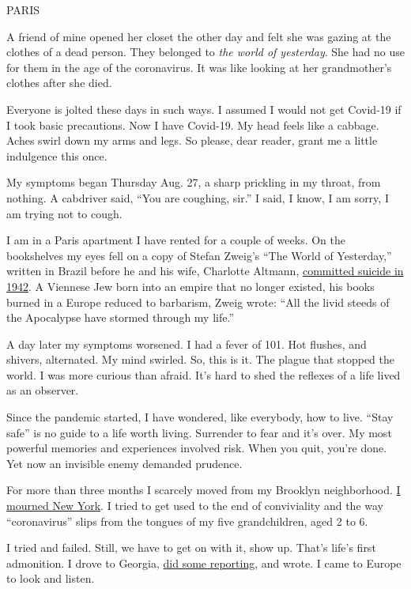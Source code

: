 PARIS

A friend of mine opened her closet the other day and felt she was gazing
at the clothes of a dead person. They belonged to \emph{the world of
yesterday}. She had no use for them in the age of the coronavirus. It
was like looking at her grandmother's clothes after she died.

Everyone is jolted these days in such ways. I assumed I would not get
Covid-19 if I took basic precautions. Now I have Covid-19. My head feels
like a cabbage. Aches swirl down my arms and legs. So please, dear
reader, grant me a little indulgence this once.

My symptoms began Thursday Aug. 27, a sharp prickling in my throat, from
nothing. A cabdriver said, ``You are coughing, sir.'' I said, I know, I
am sorry, I am trying not to cough.

I am in a Paris apartment I have rented for a couple of weeks. On the
bookshelves my eyes fell on a copy of Stefan Zweig's ``The World of
Yesterday,'' written in Brazil before he and his wife, Charlotte
Altmann,
\href{https://www.newyorker.com/magazine/2012/08/27/the-escape-artist-3}{committed
suicide in 1942}. A Viennese Jew born into an empire that no longer
existed, his books burned in a Europe reduced to barbarism, Zweig wrote:
``All the livid steeds of the Apocalypse have stormed through my life.''

A day later my symptoms worsened. I had a fever of 101. Hot flushes, and
shivers, alternated. My mind swirled. So, this is it. The plague that
stopped the world. I was more curious than afraid. It's hard to shed the
reflexes of a life lived as an observer.

Since the pandemic started, I have wondered, like everybody, how to
live. ``Stay safe'' is no guide to a life worth living. Surrender to
fear and it's over. My most powerful memories and experiences involved
risk. When you quit, you're done. Yet now an invisible enemy demanded
prudence.

For more than three months I scarcely moved from my Brooklyn
neighborhood.
\href{https://www.nytimes3xbfgragh.onion/2020/04/10/opinion/coronavirus-new-york.html}{I
mourned New York}. I tried to get used to the end of conviviality and
the way ``coronavirus'' slips from the tongues of my five grandchildren,
aged 2 to 6.

I tried and failed. Still, we have to get on with it, show up. That's
life's first admonition. I drove to Georgia,
\href{https://www.nytimes3xbfgragh.onion/2020/06/26/opinion/let-freedom-ring-from-georgia.html}{did
some reporting}, and wrote. I came to Europe to look and listen.


